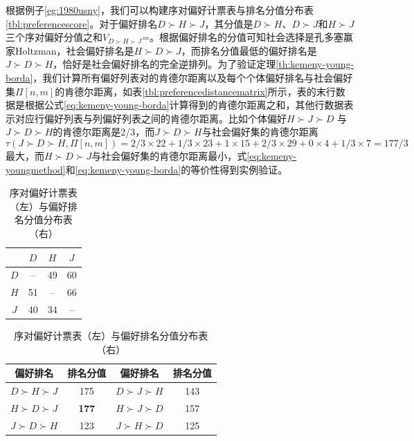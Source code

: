 \begin{example}
根据例子\ref{eg:1980usny}，我们可以构建序对偏好计票表与排名分值分布表\ref{tbl:preferencescore}。对于偏好排名$D\succ H\succ J$，其分值是$D\succ H$、$D\succ J$和$H\succ J$三个序对偏好分值之和$V_{D\succ H\succ J}$=。根据偏好排名的分值可知社会选择是孔多塞赢家Holtzman，社会偏好排名是$H\succ D\succ J$，而排名分值最低的偏好排名是$J\succ D\succ H$，恰好是社会偏好排名的完全逆排列。为了验证定理\ref{th:kemeny-young-borda}，我们计算所有偏好列表对的肯德尔距离以及每个个体偏好排名与社会偏好集$\Pi[n,m]$的肯德尔距离，如表\ref{tbl:preferencedistancematrix}所示，表的末行数据是根据公式\ref{eq:kemeny-young-borda}计算得到的肯德尔距离之和，其他行数据表示对应行偏好列表与列偏好列表之间的肯德尔距离。比如个体偏好$H\succ J\succ D$ 与$J\succ D\succ H$的肯德尔距离是2/3，而$J\succ D\succ H$与社会偏好集的肯德尔距离
\[
    \tau(J\succ D\succ H, \Pi[n,m]) = 2/3\times 22 + 1/3\times 23 + 1\times 15 + 2/3\times 29 + 0\times 4 + 1/3\times 7 = 177/3
\]
最大，而$H\succ D\succ J$与社会偏好集的肯德尔距离最小，式\ref{eq:kemeny-youngmethod}和\ref{eq:kemeny-young-borda}的等价性得到实例验证。
\begin{table}[ht]
    \centering
    \begin{minipage}[t]{0.33\linewidth}
    \centering
    \begin{tabular}{c|ccc}
      \hline
       & $D$ & $H$ & $J$\\
      \hline
      $D$ & -- & 49 & 60\\
      $H$ & 51 & -- & 66\\
      $J$ & 40 & 34 & -- \\
      \hline
    \end{tabular}
    \end{minipage}
    \begin{minipage}[t]{0.65\linewidth}
    \centering
    \begin{tabular}{c|c|c|c}
      \hline
      偏好排名 & 排名分值 & 偏好排名 & 排名分值\\
      \hline
      $D\succ H\succ J$ & 175 & $D\succ J\succ H$ & 143\\ %
      \textbf{$H\succ D\succ J$} & \textbf{177} & $H\succ J\succ D$ & 157\\ %
      $J\succ D\succ H$ & 123 & $J\succ H\succ D$ & 125\\ %
      \hline
    \end{tabular}
    \end{minipage}
    \caption{序对偏好计票表（左）与偏好排名分值分布表（右）}

\end{table}
\end{example}
